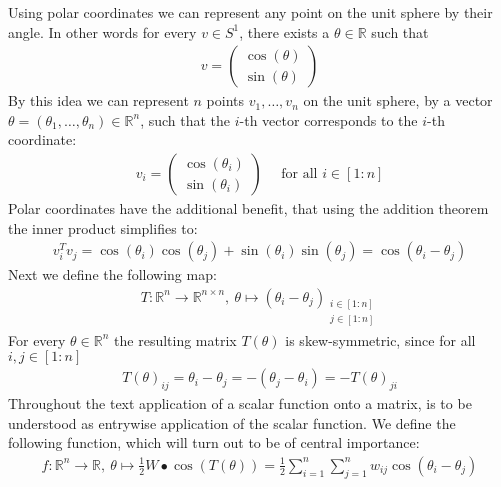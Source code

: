 \documentclass[12pt,a4paper]{article}
\theoremstyle{mythm}
\begin{document}
Using polar coordinates we can represent any point on the unit sphere by their angle.
In other words for every $ v \in S^1 $, there exists a $ \theta \in \mathbb{R}  $ such that 
\begin{align*}
v = 
\begin{pmatrix}
\cos( \theta ) \\
\sin( \theta ) 
\end{pmatrix} 
\end{align*} 
By this idea we can represent $ n $ points $ v_1, \dots, v_n $ on the unit sphere, by a vector 
$ \theta = \left( \theta _{ 1 } , \dots, \theta _{ n }  \right) \in \mathbb{R} ^{ n }  $, such that 
the $ i $-th vector corresponds to the $ i $-th coordinate:
\begin{align}
\label{eq:polar} 
v_i = 
\begin{pmatrix}
\cos( \theta  _{ i } ) \\
\sin( \theta _{ i } ) 
\end{pmatrix} 
\quad \text{ for all } i \in \left[ 1:n \right] 
\end{align} 
Polar coordinates have the additional benefit, that using the addition theorem the inner product simplifies to:
\begin{align}
\label{eq:sp2cos} 
v_i ^{ T } v_j = \cos( \theta _{ i }  ) \cos( \theta _{ j }  ) + \sin( \theta _{ i }  ) \sin( \theta _{ j }  ) = \cos( \theta _{ i } - \theta _{ j }  ) 
\end{align} 
Next we define the following map: 
\begin{align*}
T  : \mathbb{R} ^{ n }  \to \mathbb{R} ^{ n \times n }  , \ \theta  \mapsto \left(  \theta _{ i } - \theta _{ j } \right)
_{ \substack{i \in \left[  1:n\right] \\ j \in \left[  1:n\right] } } 
\end{align*} 
For every $ \theta \in \mathbb{R} ^{ n }  $ the resulting matrix $ T \left( \theta \right)  $ is skew-symmetric, since for all $ i,j \in \left[ 1:n \right]  $
\begin{align*}
T (\theta) _{ ij } = \theta _{ i } - \theta _{ j } = - \left( \theta _{ j } - \theta _{ i }  \right) = - T (\theta) _{ ji } 
\end{align*} 
Throughout the text application of a scalar function onto a matrix, is to be understood as entrywise application of the scalar function.
We define the following function, which will turn out to be of central importance:
\begin{align*}
f : \mathbb{R} ^{ n }  \to \mathbb{R}  , \ \theta \mapsto \frac{ 1 }{ 2 } W \bullet \cos( T(\theta) ) = \frac{ 1 }{ 2 } \sum_{ i = 1 }^{ n } \sum_{ j = 1 }^{ n } w _{ ij }
\cos( \theta _{ i } - \theta _{ j }  ) 
\end{align*} 
\end{document}
